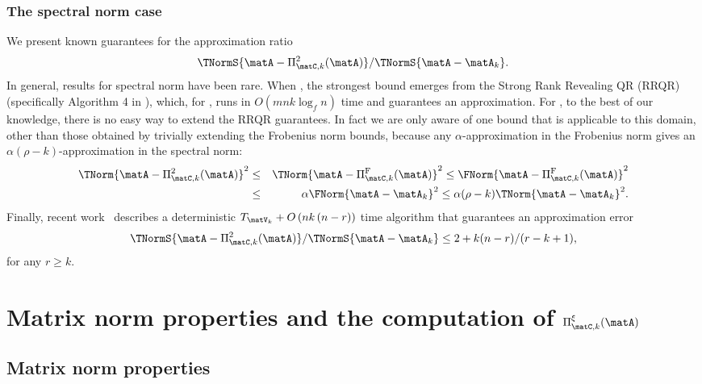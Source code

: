 \subsubsection{The spectral norm case}

We present known guarantees for the approximation ratio
$$  \TNormS{\matA-\Pi_{\matC,k}^2(\matA)} / \TNormS{\matA-\matA_k} .$$
In general,
results for spectral norm have been rare.
When ,
the strongest bound emerges from the Strong Rank Revealing
 QR (RRQR) \cite{GE96} (specifically Algorithm 4 in \cite{GE96}), which, for
, runs in $O(mnk \log_{f} n )$ time and guarantees an
 approximation. For , to the
best of our knowledge, there is no easy way to extend the
RRQR guarantees. In fact we are only aware of one bound that is
applicable to this domain, other than those obtained by trivially
extending the Frobenius norm bounds, because
any $\alpha$-approximation in the Frobenius norm gives an
$\alpha(\rho-k)$-approximation in the spectral norm:
\begin{eqnarray*}
\TNorm{\matA -\Pi_{\matC,k}^2(\matA)}^2 &\leq&
\TNorm{\matA -\Pi_{\matC,k}^{\mathrm{F}}(\matA)}^2 \leq
\FNorm{\matA -\Pi_{\matC,k}^{\mathrm{F}}(\matA)}^2\\
&\leq&
\alpha \FNorm{\matA-\matA_k}^2 \leq \alpha(\rho-k)\TNorm{\matA-\matA_k}^2.
\end{eqnarray*}
Finally, recent work~\cite{AB11} describes a deterministic $T_{\matV_k}+O\left(nk\left(n-r\right)\right)$ time algorithm that guarantees an approximation error 
$$ \TNormS{\matA-\Pi_{\matC,k}^2(\matA)} / \TNormS{\matA-\matA_k} \le 2 + k(n-r) / (r-k+1),$$ for any $r \ge k$.

\section{Matrix norm properties and the computation of $\Pi_{\matC,k}^\xi(\matA)$}
\label{sec:prel}

\subsection{Matrix norm properties}

